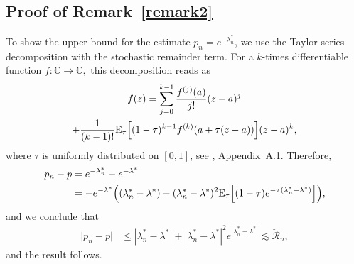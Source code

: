 \documentclass[a4paper,11pt]{article}
\theoremstyle{definition}
\newcommand{\1}{\mathbb{I}}
\newcommand{\E}{{\mathrm E}}
\newcommand{\C}{\mathbb{C}}
\theoremstyle{remark}
\begin{document}
\subsection{Proof of Remark~\ref{remark2}}
To show the upper bound for the estimate $p_n= e^{-\lambda^*_n}$, we use the Taylor series decomposition with the stochastic remainder term. For a \(k\)-times differentiable function \(f: \C \to \C,\) this decomposition reads as 
\begin{multline}
    f(z) = \sum_{j=0}^{k-1}\frac{f^{(j)}(a)}{j!}(z - a)^j \\+ \frac{1}{(k - 1)!}\E_{\tau}\Bigl[
(1 - \tau)^{k - 1} f^{(k)}(a + \tau(z - a))\Bigr]
(z - a)^k, 
\label{taylor}
\end{multline}
where $\tau$ is uniformly distributed on $[0, 1]$, see \cite{panov_morozova}, Appendix~A.1. Therefore, \begin{align*}
    p_n - p &= e^{-\lambda^*_n} - e^{-\lambda^*} \\ 
    &= -e^{-\lambda^*}\Bigl((\lambda^*_n - \lambda^*) - (\lambda^*_n - \lambda^*)^2 \E_{\tau} \Bigl[ (1 - \tau)e^{-\tau(\lambda^*_n - \lambda^*)}\Bigr]\Bigr),
\end{align*}
and we conclude that 
\begin{align}\label{p_estim}
    \bigl|p_n - p\bigr| &\leq |\lambda^*_n - \lambda^*| + |\lambda^*_n - \lambda^*|^2e^{|\lambda^*_n - \lambda^*|} \lesssim \breve{\mathcal{R}}_n,
\end{align}
and the result follows.
\end{document}
